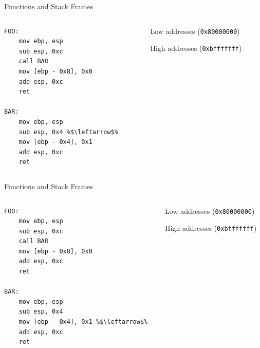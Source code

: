 \documentclass[]{beamer}
\begin{document}
\begin{frame}[fragile]{Functions and Stack Frames}
  \begin{columns}
    \begin{column}{0.45\linewidth}
      \begin{lstlisting}[language={[x86masm]Assembler}, escapechar=\%]
FOO:
    mov ebp, esp 
    sub esp, 0xc 
    call BAR 
    mov [ebp - 0x8], 0x0 
    add esp, 0xc 
    ret

BAR:
    mov ebp, esp 
    sub esp, 0x4 %$\leftarrow$%
    mov [ebp - 0x4], 0x1
    add esp, 0xc
    ret
      \end{lstlisting}
    \end{column}
    \begin{column}{0.4\linewidth}
      \par
      {\scriptsize Low addresses ({\tt 0x80000000})}\\[.5em]
      {\scriptsize High addresses ({\tt 0xbfffffff})}
    \end{column}
  \end{columns}
\end{frame}

\begin{frame}[fragile]{Functions and Stack Frames}
  \begin{columns}
    \begin{column}{0.45\linewidth}
      \begin{lstlisting}[language={[x86masm]Assembler}, escapechar=\%]
FOO:
    mov ebp, esp 
    sub esp, 0xc 
    call BAR 
    mov [ebp - 0x8], 0x0 
    add esp, 0xc 
    ret

BAR:
    mov ebp, esp 
    sub esp, 0x4 
    mov [ebp - 0x4], 0x1 %$\leftarrow$%
    add esp, 0xc
    ret
      \end{lstlisting}
    \end{column}
    \begin{column}{0.4\linewidth}
      \par
      {\scriptsize Low addresses ({\tt 0x80000000})}\\[.5em]
      {\scriptsize High addresses ({\tt 0xbfffffff})}
    \end{column}
  \end{columns}
\end{frame}
\end{document}

